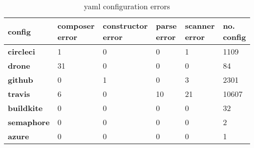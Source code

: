 \begin {table}[!htbp]

\caption{yaml configuration errors}
\label{table_yaml_errors}
\begin{tabular}{|l|l|l|l|l|l|}
\hline
\textbf{config} &  composer error &  constructor error &  parse error &  scanner error &  no. config \\ \hline

\textbf{circleci } &               1 &                  0 &            0 &              1 &        1109 \\ \hline
\textbf{drone    } &              31 &                  0 &            0 &              0 &          84 \\ \hline
\textbf{github   } &               0 &                  1 &            0 &              3 &        2301 \\ \hline
\textbf{travis   } &               6 &                  0 &           10 &             21 &       10607 \\ \hline
\textbf{buildkite} &               0 &                  0 &            0 &              0 &          32 \\ \hline
\textbf{semaphore} &               0 &                  0 &            0 &              0 &           2 \\ \hline
\textbf{azure    } &               0 &                  0 &            0 &              0 &           1 \\ \hline

\end{tabular}
\end{table}
